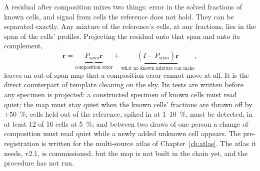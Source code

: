 A residual after composition mixes two things: error in the solved fractions of known cells, and signal from cells the reference does not hold. They can be
separated exactly. Any mixture of the reference's cells, at any fractions, lies in the span of the cells' profiles. Projecting the residual onto that span and
onto its complement,
\begin{equation}
  \mathbf r=\underbrace{P_{\mathrm{span}}\mathbf r}_{\text{composition error}}+\underbrace{(I-P_{\mathrm{span}})\mathbf r}_{\text{what no known mixture can make}},
  \label{eq:outspan}
\end{equation}
leaves an out-of-span map that a composition error cannot move at all. \derived{} It is the direct counterpart of template cleaning on the sky. Its tests are
written before any specimen is projected: a constructed specimen of known cells must read quiet; the map must
stay quiet when the known cells' fractions are thrown off by $\pm50$~\%; cells held out of the reference, spiked in at 1--10~\%, must be detected, in at least 12 of 16 cells at 5~\%; and between two
draws of one person a change of composition must read quiet while a newly added unknown cell appears. \prediction{} The pre-registration is written for the multi-source atlas of
Chapter~\ref{ch:atlas}. The atlas it needs, v2.1, is commissioned, but the map is not built in the chain yet, and the procedure has not run. \openprob

